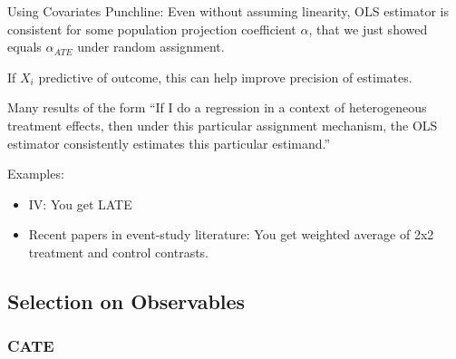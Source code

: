 \documentclass[aspectratio=169, handout]{beamer}
\begin{document}
{\footnotesize
\begin{frame}{Using Covariates}
\alert{Punchline}:
Even without assuming linearity, OLS estimator is consistent for some
population projection coefficient $\alpha$, that we just showed equals
$\alpha_{ATE}$ under random assignment.

\pause
If $X_i$ predictive of outcome, this can help improve precision of
estimates.
\pause

Many results of the form ``If I do a regression in a context of
\alert{heterogeneous treatment effects}, then under this
particular assignment mechanism, the OLS estimator consistently
estimates \alert{this particular estimand}.''

Examples:
\begin{itemize}
  \item IV: You get LATE
  \item Recent papers in event-study literature:
    You get weighted average of 2x2 treatment and control contrasts.
\end{itemize}
\end{frame}
}



\subsection{Selection on Observables}

\subsubsection{CATE}
\end{document}
